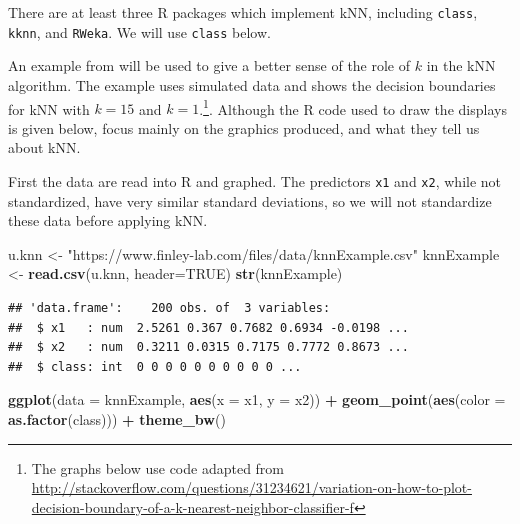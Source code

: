 \documentclass[
]{krantz}
\newenvironment{Shaded}{\begin{snugshade}}{\end{snugshade}}
\newcommand{\DataTypeTok}[1]{\textcolor[rgb]{0.13,0.29,0.53}{#1}}
\newcommand{\KeywordTok}[1]{\textcolor[rgb]{0.13,0.29,0.53}{\textbf{#1}}}
\newcommand{\NormalTok}[1]{#1}
\newcommand{\OperatorTok}[1]{\textcolor[rgb]{0.81,0.36,0.00}{\textbf{#1}}}
\newcommand{\OtherTok}[1]{\textcolor[rgb]{0.56,0.35,0.01}{#1}}
\newcommand{\StringTok}[1]{\textcolor[rgb]{0.31,0.60,0.02}{#1}}
\begin{document}
There are at least three R packages which implement kNN, including \texttt{class}, \texttt{kknn}, and \texttt{RWeka}. We will use \texttt{class} below.

An example from \citet{hastieESL} will be used to give a better sense of the role of \(k\) in the kNN algorithm. The example uses simulated data and shows the decision boundaries for kNN with \(k=15\) and \(k=1\).\footnote{The graphs below use code adapted from \url{http://stackoverflow.com/questions/31234621/variation-on-how-to-plot-decision-boundary-of-a-k-nearest-neighbor-classifier-f}}. Although the R code used to draw the displays is given below, focus mainly on the graphics produced, and what they tell us about kNN.

First the data are read into R and graphed. The predictors \texttt{x1} and \texttt{x2}, while not standardized, have very similar standard deviations, so we will not standardize these data before applying kNN.

\begin{Shaded}
\begin{Highlighting}[]
\NormalTok{u.knn \textless{}{-}}\StringTok{ "https://www.finley{-}lab.com/files/data/knnExample.csv"}
\NormalTok{knnExample \textless{}{-}}\StringTok{ }\KeywordTok{read.csv}\NormalTok{(u.knn, }\DataTypeTok{header=}\OtherTok{TRUE}\NormalTok{)}
\KeywordTok{str}\NormalTok{(knnExample)}
\end{Highlighting}
\end{Shaded}

\begin{verbatim}
## 'data.frame':    200 obs. of  3 variables:
##  $ x1   : num  2.5261 0.367 0.7682 0.6934 -0.0198 ...
##  $ x2   : num  0.3211 0.0315 0.7175 0.7772 0.8673 ...
##  $ class: int  0 0 0 0 0 0 0 0 0 0 ...
\end{verbatim}

\begin{Shaded}
\begin{Highlighting}[]
\KeywordTok{ggplot}\NormalTok{(}\DataTypeTok{data =}\NormalTok{ knnExample, }\KeywordTok{aes}\NormalTok{(}\DataTypeTok{x =}\NormalTok{ x1, }\DataTypeTok{y =}\NormalTok{ x2)) }\OperatorTok{+}\StringTok{ }
\StringTok{   }\KeywordTok{geom\_point}\NormalTok{(}\KeywordTok{aes}\NormalTok{(}\DataTypeTok{color =} \KeywordTok{as.factor}\NormalTok{(class))) }\OperatorTok{+}
\StringTok{   }\KeywordTok{theme\_bw}\NormalTok{()}
\end{Highlighting}
\end{Shaded}
\end{document}
